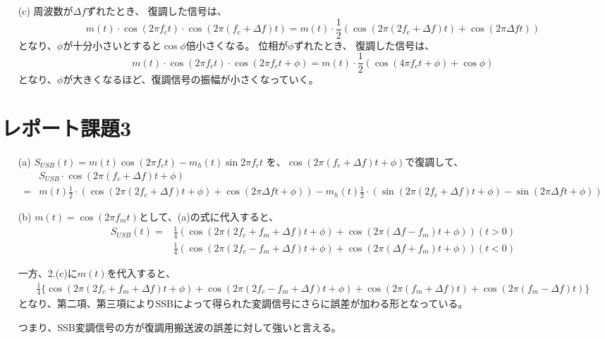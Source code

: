 \documentclass[dvipdfmx]{jsarticle}
\begin{document}
\begin{enumerate}
\item[(c)]
周波数が$\Delta f$ずれたとき、
復調した信号は、
\[
m(t)\cdot \cos{(2\pi f_{c}t)}\cdot \cos{(2\pi (f_{c}+\Delta f)t)} = m(t)\cdot \frac{1}{2} \left(\cos{(2\pi(2f_{c}+\Delta f)t)}+\cos{(2\pi\Delta ft)}\right)
\]
となり、$\phi$が十分小さいとすると$\cos{\phi}$倍小さくなる。
位相が$\phi$ずれたとき、
復調した信号は、
\[
m(t)\cdot \cos{(2\pi f_{c}t)}\cdot \cos{(2\pi f_{c}t+\phi)} = m(t)\cdot \frac{1}{2} \left(\cos{(4\pi f_{c}t+\phi)}+\cos{\phi}\right)
\]
となり、$\phi$が大きくなるほど、復調信号の振幅が小さくなっていく。
\end{enumerate}



\section*{レポート課題3}
\begin{enumerate}
\item[(a)]
$S_{USB}(t) = m(t)\cos{(2\pi f_{c}t)} - m_{h}(t)\sin{2\pi f_{c}t}$
を、$\cos{(2\pi (f_{c}+\Delta f)t + \phi)}$で復調して、
\begin{align*}
&S_{USB}\cdot \cos{(2\pi (f_{c}+\Delta f)t + \phi)} \\
=&m(t)\frac{1}{2}\cdot \left(\cos{(2\pi (2f_{c}+\Delta f)t+\phi)} + \cos{(2\pi \Delta ft+\phi)} \right) - m_{h}(t)\frac{1}{2}\cdot \left(\sin{(2\pi (2f_{c}+\Delta f)t+\phi)} - \sin{(2\pi \Delta ft+\phi)} \right)
\end{align*}
\item[(b)]
$m(t) = \cos{(2\pi f_{m} t)}$として、(a)の式に代入すると、
\begin{align*}
S_{USB}(t) = &\frac{1}{4}\left(\cos{\left(2\pi(2f_{c}+f_{m}+\Delta f)t+\phi\right)}+\cos{\left(2\pi(\Delta f-f_{m})t+\phi\right)}\right) (t>0)\\
&\frac{1}{4}\left(\cos{\left(2\pi(2f_{c}-f_{m}+\Delta f)t+\phi\right)}+\cos{\left(2\pi(\Delta f+f_{m})t+\phi\right)}\right) (t<0)
\end{align*}

一方、2.(c)に$m(t)$を代入すると、
\begin{align*}
\frac{1}{4}\{\cos{(2\pi(2f_{c}+f_{m}+\Delta f)t+\phi)}+\cos{(2\pi (2f_{c}-f_{m}+\Delta f)t+\phi)}+\cos{(2\pi(f_{m}+\Delta f)t)} + \cos{(2\pi (f_{m}-\Delta f)t)}\}
\end{align*}
となり、第二項、第三項によりSSBによって得られた変調信号にさらに誤差が加わる形となっている。

つまり、SSB変調信号の方が復調用搬送波の誤差に対して強いと言える。

\end{enumerate}
\end{document}
